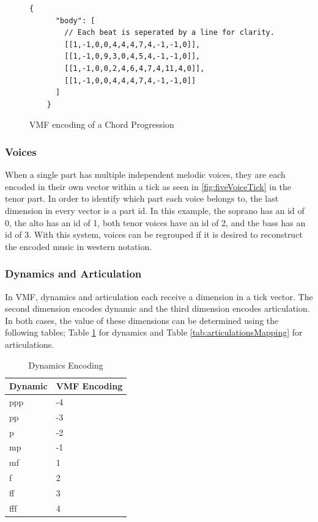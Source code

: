 \begin{figure}
  \begin{center}
    \begin{Verbatim}[fontfamily=courier, xleftmargin=\parindent]
    {
      "body": [
        // Each beat is seperated by a line for clarity.
        [[1,-1,0,0,4,4,4,7,4,-1,-1,0]],
        [[1,-1,0,9,3,0,4,5,4,-1,-1,0]],
        [[1,-1,0,0,2,4,6,4,7,4,11,4,0]],
        [[1,-1,0,0,4,4,4,7,4,-1,-1,0]]
      ]
    }
    \end{Verbatim}
    \caption{VMF encoding of a Chord Progression}
    \label{fig:chordsVMF}
  \end{center}
\end{figure}

\subsubsection{Voices}

When a single part has multiple independent melodic voices, they are each encoded in their own vector within a tick as seen in \ref{fig:fiveVoiceTick} in the tenor part. In order to identify which part each voice belongs to, the last dimension in every vector is a part id. In this example, the soprano has an id of 0, the alto has an id of 1, both tenor voices have an id of 2, and the bass has an id of 3. With this system, voices can be regrouped if it is desired to reconstruct the encoded music in western notation.

\subsubsection{Dynamics and Articulation}

In VMF, dynamics and articulation each receive a dimension in a tick vector. The second dimension encodes dynamic and the third dimension encodes articulation. In both cases, the value of these dimensions can be determined using the following tables; Table \ref{tab:dynamicsMapping} for dynamics and Table \ref{tab:articulationsMapping} for articulations.

\begin{table}[ht]
  \centering
  \begin{tabular}{ll}
  Dynamic & VMF Encoding \\ \hline
  ppp      & -4 \\
  pp       & -3 \\
  p        & -2 \\
  mp       & -1 \\
  mf       & 1 \\
  f        & 2 \\
  ff       & 3 \\
  fff      & 4 \\
  \end{tabular}
  \caption{Dynamics Encoding}
  \label{tab:dynamicsMapping}
\end{table}

